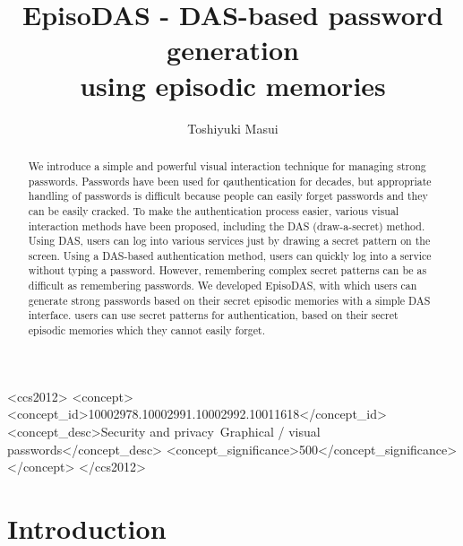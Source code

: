 \documentclass[sigconf]{acmart}
\begin{document}
\title{EpisoDAS - DAS-based password generation \\
using episodic memories}

\author{Toshiyuki Masui}

\renewcommand{\shortauthors}{T. Masui}

\begin{CCSXML}
  <ccs2012>
  <concept>
  <concept_id>10002978.10002991.10002992.10011618</concept_id>
  <concept_desc>Security and privacy~Graphical / visual passwords</concept_desc>
  <concept_significance>500</concept_significance>
  </concept>
  </ccs2012>
\end{CCSXML}


\begin{abstract}

We introduce a simple and powerful visual interaction technique for
managing strong passwords.
%
Passwords have been used for qauthentication for decades, but
appropriate handling of passwords is difficult because people can
easily forget passwords and they can be easily cracked.
%
To make the authentication process easier, various visual interaction
methods have been proposed, including the DAS (draw-a-secret)
method. Using DAS, users can log into various services just by drawing
a secret pattern on the screen.
%
Using a DAS-based authentication method, users can quickly log into a
service without typing a password. However, remembering complex secret
patterns can be as difficult as remembering passwords. We developed
EpisoDAS, with which users can generate strong passwords based on
their secret episodic memories with a simple DAS interface.
%
users can use secret patterns for authentication, based on their
secret episodic memories which they cannot easily forget.

\end{abstract}

\maketitle

\section{Introduction}
\end{document}
